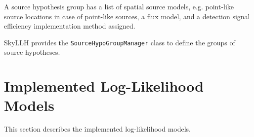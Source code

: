 \documentclass{article}
\newcommand{\code}[1]{\texttt{#1}}
\newcommand{\class}[1]{\colorbox{blue!30}{\code{#1}}}
\begin{document}
A source hypothesis group has a list of spatial source models, e.g. point-like source
locations in case of point-like sources, a flux model, and a detection signal
efficiency implementation method assigned.

SkyLLH provides the \class{SourceHypoGroupManager} class to define the groups of
source hypotheses.

\section{Implemented Log-Likelihood Models}
This section describes the implemented log-likelihood models. \cite{TimeDepPSSearchMethods2010}

%
%



\end{document}
